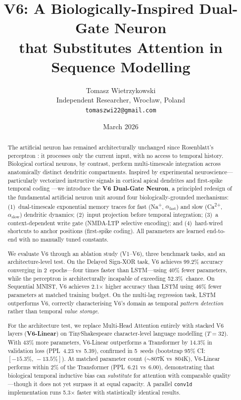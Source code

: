 \documentclass[11pt,a4paper]{article}
\title{%
  \textbf{V6: A Biologically-Inspired Dual-Gate Neuron\\
  that Substitutes Attention in Sequence Modelling}%
}
\author{%
  Tomasz Wietrzykowski\\
  Independent Researcher, Wroc\l{}aw, Poland\\
  \texttt{tomaszwi22@gmail.com}%
}
\date{March 2026}
\begin{document}
\maketitle

\begin{abstract}
The artificial neuron has remained architecturally unchanged since
Rosenblatt's perceptron \citep{rosenblatt1958perceptron}: it processes only the current input,
with no access to temporal history.
Biological cortical neurons, by contrast, perform multi-timescale integration
across anatomically distinct dendritic compartments.
Inspired by experimental neuroscience---particularly vectorized instructive
signals in cortical apical dendrites \citep{francioni2026vectorized}
and first-spike temporal coding \citep{thorpe2001spike}---we introduce
the \textbf{V6 Dual-Gate Neuron}, a principled redesign of the fundamental
artificial neuron unit around four biologically-grounded mechanisms:
(1)~dual-timescale exponential memory traces for fast
(Na\textsuperscript{+}, $\alpha_\mathrm{fast}$) and slow
(Ca\textsuperscript{2+}, $\alpha_\mathrm{slow}$) dendritic dynamics;
(2)~input projection before temporal integration;
(3)~a context-dependent write gate (NMDA-LTP selective encoding); and
(4)~hard-wired shortcuts to anchor positions (first-spike coding).
All parameters are learned end-to-end with no manually tuned constants.

We evaluate V6 through an ablation study (V1--V6), three benchmark tasks,
and an architecture-level test.
On the Delayed Sign-XOR task, V6 achieves 99.2\% accuracy converging in
2~epochs---four times faster than LSTM---using 40\% fewer parameters,
while the perceptron is architecturally incapable of exceeding 52.3\%~chance.
On Sequential MNIST, V6 achieves 2.1$\times$ higher accuracy than LSTM
using 46\% fewer parameters at matched training budget.
On the multi-lag regression task, LSTM outperforms V6, correctly
characterising V6's domain as temporal \emph{pattern detection}
rather than temporal \emph{value storage}.

For the architecture test, we replace Multi-Head Attention entirely with
stacked V6 layers (\textbf{V6-Linear}) on TinyShakespeare character-level
language modelling ($T=32$).
With 43\% more parameters, V6-Linear outperforms
a Transformer by 14.3\% in validation loss (PPL~4.23 vs~5.39), confirmed in
5~seeds (bootstrap 95\% CI: $[-15.3\%,\,-13.5\%]$).
At matched parameter count ($\sim$807K vs~804K), V6-Linear performs
within 2\% of the Transformer (PPL~6.21 vs~6.00), demonstrating that
biological temporal inductive bias can \emph{substitute} for attention
with comparable quality---though it does not yet surpass it at equal
capacity.
A parallel \texttt{conv1d} implementation runs 5.3$\times$ faster
with statistically identical results.


\end{abstract}
\end{document}
